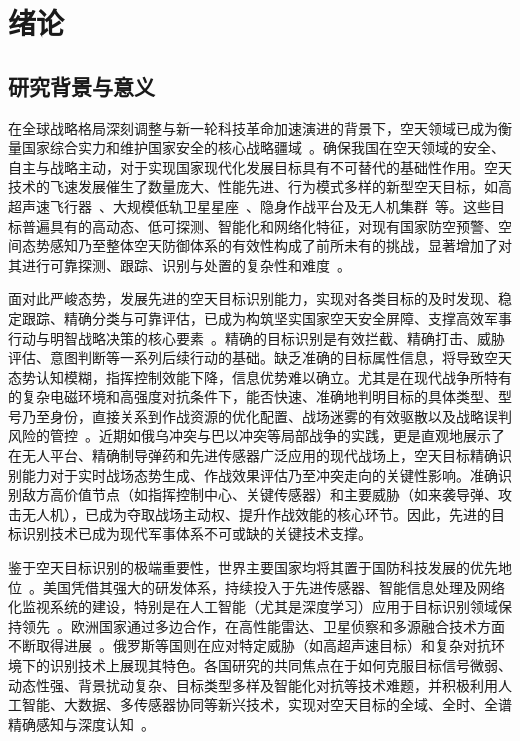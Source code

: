 \chapter{绪论}

\section{研究背景与意义}

在全球战略格局深刻调整与新一轮科技革命加速演进的背景下，空天领域已成为衡量国家综合实力和维护国家安全的核心战略疆域~\cite{X}。确保我国在空天领域的安全、自主与战略主动，对于实现国家现代化发展目标具有不可替代的基础性作用。空天技术的飞速发展催生了数量庞大、性能先进、行为模式多样的新型空天目标，如高超声速飞行器~\cite{X}、大规模低轨卫星星座~\cite{X}、隐身作战平台及无人机集群~\cite{X}等。这些目标普遍具有的高动态、低可探测、智能化和网络化特征，对现有国家防空预警、空间态势感知乃至整体空天防御体系的有效性构成了前所未有的挑战，显著增加了对其进行可靠探测、跟踪、识别与处置的复杂性和难度~\cite{X}。

面对此严峻态势，发展先进的空天目标识别能力，实现对各类目标的及时发现、稳定跟踪、精确分类与可靠评估，已成为构筑坚实国家空天安全屏障、支撑高效军事行动与明智战略决策的核心要素~\cite{X}。精确的目标识别是有效拦截、精确打击、威胁评估、意图判断等一系列后续行动的基础。缺乏准确的目标属性信息，将导致空天态势认知模糊，指挥控制效能下降，信息优势难以确立。尤其是在现代战争所特有的复杂电磁环境和高强度对抗条件下，能否快速、准确地判明目标的具体类型、型号乃至身份，直接关系到作战资源的优化配置、战场迷雾的有效驱散以及战略误判风险的管控~\cite{X}。近期如俄乌冲突与巴以冲突等局部战争的实践，更是直观地展示了在无人平台、精确制导弹药和先进传感器广泛应用的现代战场上，空天目标精确识别能力对于实时战场态势生成、作战效果评估乃至冲突走向的关键性影响。准确识别敌方高价值节点（如指挥控制中心、关键传感器）和主要威胁（如来袭导弹、攻击无人机），已成为夺取战场主动权、提升作战效能的核心环节。因此，先进的目标识别技术已成为现代军事体系不可或缺的关键技术支撑。

鉴于空天目标识别的极端重要性，世界主要国家均将其置于国防科技发展的优先地位~\cite{X}。美国凭借其强大的研发体系，持续投入于先进传感器、智能信息处理及网络化监视系统的建设，特别是在人工智能（尤其是深度学习）应用于目标识别领域保持领先~\cite{X}。欧洲国家通过多边合作，在高性能雷达、卫星侦察和多源融合技术方面不断取得进展~\cite{X}。俄罗斯等国则在应对特定威胁（如高超声速目标）和复杂对抗环境下的识别技术上展现其特色。各国研究的共同焦点在于如何克服目标信号微弱、动态性强、背景扰动复杂、目标类型多样及智能化对抗等技术难题，并积极利用人工智能、大数据、多传感器协同等新兴技术，实现对空天目标的{全域、全时、全谱}精确感知与深度认知~\cite{X}。

